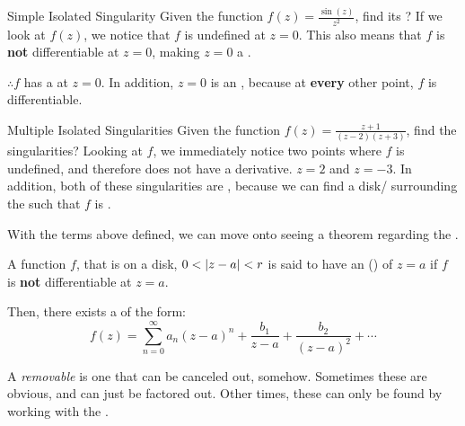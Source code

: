 \begin{example}{Simple Isolated Singularity}
  Given the function $f(z) = \frac{\sin(z)}{z^{2}}$, find its ?
  \tcblower{}
  If we look at $f(z)$, we notice that $f$ is undefined at $z=0$.
  This also means that $f$ is \textbf{not} differentiable at $z=0$, making $z=0$ a .

  $\therefore f$ has a  at $z=0$.
  In addition, $z=0$ is an  , because at \textbf{every} other point, $f$ is differentiable.
\end{example}

\begin{example}{Multiple Isolated Singularities}
  Given the function $f(z) = \frac{z+1}{(z-2) (z+3)}$, find the singularities?
  \tcblower{}
  Looking at $f$, we immediately notice two points where $f$ is undefined, and therefore does not have a derivative.
  $z=2$ and $z=-3$.
  In addition, both of these singularities are , because we can find a disk/ surrounding the  such that $f$ is .
\end{example}

With the terms above defined, we can move onto seeing a theorem regarding the .

\begin{theorem}\label{thm:Laurent_Series_Existence}
  A function $f$, that is  on a  disk, $0 < \left\lvert z-a \right\rvert < r$ is said to have an ()  of $z=a$ if $f$ is \textbf{not} differentiable at $z=a$.

  Then, there exists a  of the form:
  \begin{equation}\label{eq:Laurent_Series_Existence}
    f(z) = \sum_{n=0}^{\infty} a_{n} {(z-a)}^{n} + \frac{b_{1}}{z-a} + \frac{b_{2}}{{(z-a)}^{2}} + \cdots
  \end{equation}
\end{theorem}

\begin{definition}[Removable]\label{def:Removable}
  A \emph{removable}  is one that can be canceled out, somehow.
  Sometimes these are obvious, and can just be factored out.
  Other times, these can only be found by working with the .
\end{definition}

